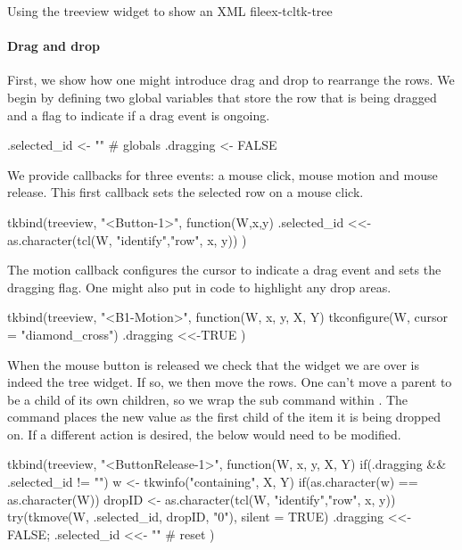 \begin{example}{Using the treeview widget to show an XML file}{ex-tcltk-tree}
\paragraph{Drag and drop}
First, we show how one might introduce drag and drop to rearrange the
rows. We begin by defining two global variables that store the row
that is being dragged  and a flag to indicate if a drag event is ongoing.
\begin{Schunk}
\begin{Sinput}
 .selected_id <- ""                               # globals
 .dragging <- FALSE
\end{Sinput}
\end{Schunk}
We provide callbacks for three events: a mouse click, mouse motion and mouse release.
This first callback sets the selected row on a mouse click.
\begin{Schunk}
\begin{Sinput}
 tkbind(treeview, "<Button-1>", function(W,x,y) {
   .selected_id <<- as.character(tcl(W, "identify","row", x, y))
 })  
\end{Sinput}
\end{Schunk}
The motion callback configures the cursor to indicate a drag event and sets
the dragging flag. One might also put in code to highlight
any drop areas.
\begin{Schunk}
\begin{Sinput}
 tkbind(treeview, "<B1-Motion>", function(W, x, y, X, Y) {
   tkconfigure(W, cursor = "diamond_cross")
   .dragging <<-TRUE
 })
\end{Sinput}
\end{Schunk}

When the mouse button is released we check that the widget we are over
is indeed the tree widget. If so, we then move the rows. One can't
move a parent to be a child of its own children, so we wrap the
 sub command within . The
 command places the new value as the first child of the
item it is being dropped on. If a different action is desired, the
 below would need to be modified.
\begin{Schunk}
\begin{Sinput}
 tkbind(treeview, "<ButtonRelease-1>", function(W, x, y, X, Y) {
   if(.dragging && .selected_id != "") {
     w <- tkwinfo("containing", X, Y)
     if(as.character(w) == as.character(W)) {
       dropID <- as.character(tcl(W, "identify","row", x, y))
       try(tkmove(W, .selected_id, dropID, "0"), silent = TRUE)
     }
   }
   .dragging <<- FALSE; .selected_id <<- "" # reset
 })
\end{Sinput}
\end{Schunk}


\end{example}

